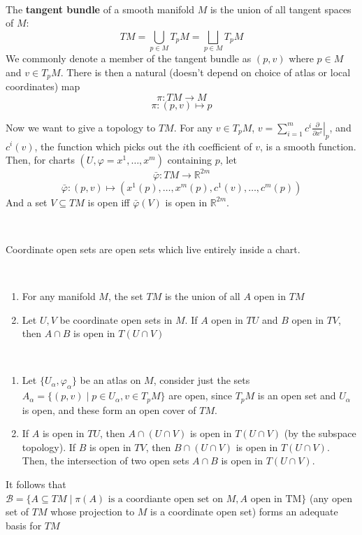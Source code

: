 \documentclass{article}
\begin{document}
\begin{definition}
  \

  The \textbf{tangent bundle} of a smooth manifold $M$ is the union of all tangent spaces of $M$: $$TM = \bigcup_{p \in M} T_pM = \bigsqcup_{p \in M} T_pM$$We commonly denote a member of the tangent bundle as $(p,v)$ where $p \in M$ and $v \in T_pM$. There is then a natural (doesn't depend on choice of atlas or local coordinates) map $$\pi: TM \to M$$$$\pi: (p, v) \mapsto p$$

  Now we want to give a topology to $TM$. For any $v \in T_pM$, $v = \sum_{i =1}^m c^i \left.\frac{\partial}{\partial x^i}\right\vert_p$, and $c^i(v)$, the function which picks out the $i$th coefficient of $v$, is a smooth function. Then, for charts $(U, \varphi = x^1, \dots, x^m)$ containing $p$, let $$\bar{\varphi}: TM \to \mathbb{R}^{2m}$$$$\bar{\varphi}: (p, v) \mapsto (x^1(p), \dots, x^m(p), c^1(v), \dots, c^m(p))$$And a set $V \subseteq TM$ is open iff $\bar{\varphi}(V)$ is open in $\mathbb{R}^{2m}$.
\end{definition}

\begin{remark}
  \

  Coordinate open sets are open sets which live entirely inside a chart.
\end{remark}

\begin{lemma}
  \

  \begin{enumerate}
    \item For any manifold $M$, the set $TM$ is the union of all $A$ open in $TM$
    \item Let $U, V$ be coordinate open sets in $M$. If $A$ open in $TU$ and $B$ open in $TV$, then $A \cap B$ is open in $T(U \cap V)$
  \end{enumerate}
\end{lemma}

\begin{customproof}
  \

  \begin{enumerate}
    \item Let $\{U_\alpha, \varphi_\alpha\}$ be an atlas on $M$, consider just the sets $A_\alpha = \{(p,v) \mid p \in U_\alpha, v \in T_pM\}$ are open, since $T_pM$ is an open set and $U_\alpha$ is open, and these form an open cover of $TM$.
    \item If $A$ is open in $TU$, then $A \cap (U \cap V)$ is open in $T(U \cap V)$ (by the subspace topology). If $B$ is open in $TV$, then $B \cap (U \cap V)$ is open in $T(U \cap V)$. Then, the intersection of two open sets $A \cap B$ is open in $T(U \cap V)$.
  \end{enumerate}

  It follows that $\mathcal{B} = \{A \subseteq TM \mid \pi(A) \text{ is a coordiante open set on $M$}, A \text{ open in TM}\}$ (any open set of $TM$ whose projection to $M$ is a coordinate open set) forms an adequate basis for $TM$
\end{customproof}
\end{document}
